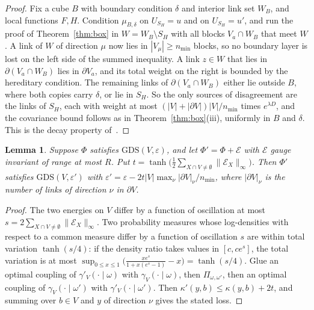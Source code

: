 \documentclass[11pt]{amsart}
\newtheorem{lemma}[theorem]{Lemma}
\theoremstyle{definition}
\theoremstyle{remark}
\begin{document}
\begin{proof}
Fix a cube $B$ with boundary condition $\delta$ and interior link set $W_B$,
and local functions $F,H$. Condition $\mu_{B,\delta}$ on $U_{S_H}=u$ and on
$U_{S_H}=u'$, and run the proof of Theorem~\ref{thm:box} in
$W=W_B\setminus S_H$ with all blocks $V_a\cap W_B$ that meet $W$. A link of $W$
of direction $\mu$ now lies in $|V_\mu|\ge n_{\min}$ blocks, so no boundary
layer is lost on the left side of the summed inequality. A link $z\in W$ that
lies in $\partial(V_a\cap W_B)$ lies in $\partial V_a$, and its total weight on
the right is bounded by the hereditary condition. The remaining links of
$\partial(V_a\cap W_B)$ either lie outside $B$, where both copies carry
$\delta$, or lie in $S_H$. So the only sources of disagreement are the links of
$S_H$, each with weight at most $(|V|+|\partial V|)|V|/n_{\min}$ times
$e^{\lambda D}$, and the covariance bound follows as in
Theorem~\ref{thm:box}(iii), uniformly in $B$ and $\delta$. This is the
decay property of~\cite[Def.~2.3]{Cha21}.
\end{proof}

\begin{lemma}\label{lem:stability}
Suppose $\Phi$ satisfies $\mathrm{GDS}(V,\varepsilon)$, and let $\Phi'=\Phi+
\mathcal E$ with $\mathcal E$ gauge invariant of range at most $R$. Put
$t=\tanh\bigl(\frac12\sum_{X\cap V\ne\emptyset}\|\mathcal E_X\|_\infty\bigr)$.
Then $\Phi'$ satisfies $\mathrm{GDS}(V,\varepsilon')$ with $\varepsilon'=
\varepsilon-2t|V|\max_\nu|\partial V|_\nu/n_{\min}$, where $|\partial V|_\nu$
is the number of links of direction $\nu$ in $\partial V$.
\end{lemma}

\begin{proof}
The two energies on $V$ differ by a function of oscillation at most
$s=2\sum_{X\cap V\ne\emptyset}\|\mathcal E_X\|_\infty$. Two probability measures
whose log-densities with respect to a common measure differ by a function of
oscillation $s$ are within total variation $\tanh(s/4)$: if the density ratio
takes values in $[c,ce^s]$, the total variation is at most
$\sup_{0\le x\le1}\bigl(\frac{xe^s}{1+x(e^s-1)}-x\bigr)=\tanh(s/4)$. Glue an
optimal coupling of $\gamma'_V(\cdot\mid\omega)$ with $\gamma_V(\cdot\mid
\omega)$, then $\Pi_{\omega,\omega'}$, then an optimal coupling of
$\gamma_V(\cdot\mid\omega')$ with $\gamma'_V(\cdot\mid\omega')$. Then
$\kappa'(y,b)\le\kappa(y,b)+2t$, and summing over $b\in V$ and $y$ of
direction $\nu$ gives the stated loss.
\end{proof}
\end{document}
